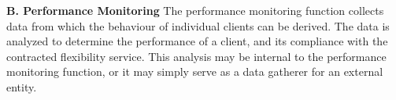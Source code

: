 \textbf{B. Performance Monitoring}
The performance monitoring function collects data from which the behaviour of individual clients can be derived. The data is analyzed to determine the performance of a client, and its compliance with the contracted flexibility service. This analysis may be internal to the performance monitoring function, or it may simply serve as a data gatherer for an external entity.
